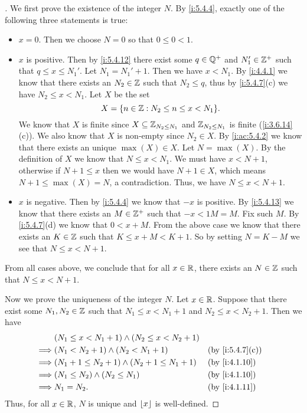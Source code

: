 \begin{proof}[]
  We first prove the existence of the integer \(N\).
  By \cref{i:5.4.4}, exactly one of the following three statements is true:
  \begin{itemize}
    \item \(x = 0\).
          Then we choose \(N = 0\) so that \(0 \leq 0 < 1\).
    \item \(x\) is positive.
          Then by \cref{i:5.4.12} there exist some \(q \in \mathbb{Q}^+\) and \(N_1' \in \mathbb{Z}^+\) such that \(q \leq x \leq N_1'\).
          Let \(N_1 = N_1' + 1\).
          Then we have \(x < N_1\).
          By \cref{i:4.4.1} we know that there exists an \(N_2 \in \mathbb{Z}\) such that \(N_2 \leq q\), thus by \cref{i:5.4.7}(c) we have \(N_2 \leq x < N_1\).
          Let \(X\) be the set
          \[
            X = \set{n \in \Z : N_2 \leq n \leq x < N_1}.
          \]
          We know that \(X\) is finite since \(X \subseteq \mathbb{Z}_{N_2 \leq N_1}\) and \(\mathbb{Z}_{N_2 \leq N_1}\) is finite (\cref{i:3.6.14}(c)).
          We also know that \(X\) is non-empty since \(N_2 \in X\).
          By \cref{i:ac:5.4.2} we know that there exists an unique \(\max(X) \in X\).
          Let \(N = \max(X)\).
          By the definition of \(X\) we know that \(N \leq x < N_1\).
          We must have \(x < N + 1\), otherwise if \(N + 1 \leq x\) then we would have \(N + 1 \in X\), which means \(N + 1 \leq \max(X) = N\), a contradiction.
          Thus, we have \(N \leq x < N + 1\).
    \item \(x\) is negative.
          Then by \cref{i:5.4.4} we know that \(-x\) is positive.
          By \cref{i:5.4.13} we know that there exists an \(M \in \mathbb{Z}^+\) such that \(-x < 1M = M\).
          Fix such \(M\).
          By \cref{i:5.4.7}(d) we know that \(0 < x + M\).
          From the above case we know that there exists an \(K \in \mathbb{Z}\) such that \(K \leq x + M < K + 1\).
          So by setting \(N = K - M\) we see that \(N \leq x < N + 1\).
  \end{itemize}
  From all cases above, we conclude that for all \(x \in \mathbb{R}\), there exists an \(N \in \mathbb{Z}\) such that \(N \leq x < N + 1\).

  Now we prove the uniqueness of the integer \(N\).
  Let \(x \in \mathbb{R}\).
  Suppose that there exist some \(N_1, N_2 \in \mathbb{Z}\) such that \(N_1 \leq x < N_1 + 1\) and \(N_2 \leq x < N_2 + 1\).
  Then we have
  \begin{align*}
             & (N_1 \leq x < N_1 + 1) \land (N_2 \leq x < N_2 + 1)                      \\
    \implies & (N_1 < N_2 + 1) \land (N_2 < N_1 + 1)               &  & \by{i:5.4.7}[c] \\
    \implies & (N_1 + 1 \leq N_2 + 1) \land (N_2 + 1 \leq N_1 + 1) &  & \by{i:4.1.10}   \\
    \implies & (N_1 \leq N_2) \land (N_2 \leq N_1)                 &  & \by{i:4.1.10}   \\
    \implies & N_1 = N_2.                                          &  & \by{i:4.1.11}
  \end{align*}
  Thus, for all \(x \in \mathbb{R}\), \(N\) is unique and \(\left\lfloor x\right\rfloor\) is well-defined.
\end{proof}

